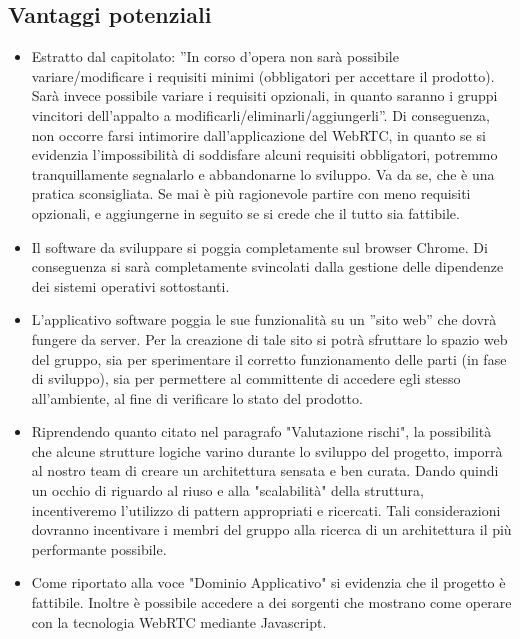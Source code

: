 \subsection{Vantaggi potenziali}
\begin{itemize}
	\item Estratto dal capitolato: ''In corso d'opera non sarà possibile variare/modificare i requisiti minimi (obbligatori per accettare il prodotto). Sarà invece possibile variare i requisiti opzionali, in quanto saranno i gruppi vincitori dell'appalto a modificarli/eliminarli/aggiungerli''. Di conseguenza, non occorre farsi intimorire dall'applicazione del WebRTC, in quanto se si evidenzia l'impossibilità di soddisfare alcuni requisiti obbligatori, potremmo tranquillamente segnalarlo e abbandonarne lo sviluppo. Va da se, che è una pratica sconsigliata. Se mai è più ragionevole partire con meno requisiti opzionali, e aggiungerne in seguito se si crede che il tutto sia fattibile.
	\item Il software da sviluppare si poggia completamente sul browser Chrome. Di conseguenza si sarà completamente svincolati dalla gestione delle dipendenze dei sistemi operativi sottostanti.
	\item L'applicativo software poggia le sue funzionalità su un ''sito web'' che dovrà fungere da server. Per la creazione di tale sito si potrà sfruttare lo spazio web del gruppo, sia per sperimentare il corretto funzionamento delle parti (in fase di sviluppo), sia per permettere al committente di accedere egli stesso all'ambiente, al fine di verificare lo stato del prodotto.
	\item Riprendendo quanto citato nel paragrafo  "Valutazione rischi", la possibilità che alcune strutture logiche varino durante lo sviluppo del progetto, imporrà al nostro team di creare un architettura sensata e ben curata. Dando quindi un occhio di riguardo al riuso e alla "scalabilità" della struttura, incentiveremo l'utilizzo di pattern appropriati e ricercati. Tali considerazioni dovranno incentivare i membri del gruppo alla ricerca di un architettura il più performante possibile.
	\item Come riportato alla voce "Dominio Applicativo" si evidenzia che il progetto è fattibile. Inoltre è possibile accedere a dei sorgenti che mostrano come operare con la tecnologia WebRTC mediante Javascript.
\end{itemize}
